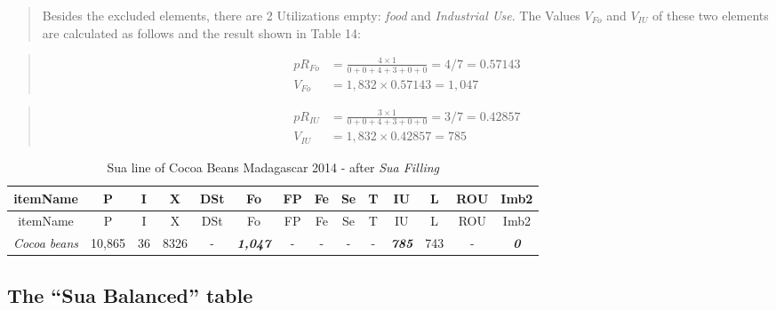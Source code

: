 \documentclass[]{article}
\begin{document}
\begin{quote}
Besides the excluded elements, there are 2 Utilizations empty:
\emph{food} and \emph{Industrial Use}. The Values \(V_{Fo}\) and
\(V_{IU}\) of these two elements are calculated as follows and the
result shown in Table 14:
\end{quote}

\begin{quote}
\begin{equation}
\begin{aligned}
pR_{Fo} &= \frac{4\times 1}{0 + 0 + 4 + 3 + 0 + 0} = 4/7 = 0.57143 \\
V_{Fo} &= 1,832 \times 0.57143 = 1,047 
\end{aligned}
\end{equation}
\end{quote}

\begin{quote}
\end{quote}

\begin{quote}
\begin{equation}
\begin{aligned}
\label{eq:VIUC}
pR_{IU} &= \frac{3\times 1}{0 + 0 + 4 + 3 + 0 + 0} = 3/7 = 0.42857\\
V_{IU} &= 1,832 \times 0.42857 = 785
\end{aligned}
\end{equation}
\end{quote}

\begin{longtable}[]{@{}cccccccccccccc@{}}
\caption{Sua line of Cocoa Beans Madagascar 2014 - after \emph{Sua
Filling}}\tabularnewline
\toprule
itemName & P & I & X & DSt & Fo & FP & Fe & Se & T & IU & L & ROU &
Imb2\tabularnewline
\midrule
\endfirsthead
\toprule
itemName & P & I & X & DSt & Fo & FP & Fe & Se & T & IU & L & ROU &
Imb2\tabularnewline
\midrule
\endhead
\emph{Cocoa beans} & 10,865 & 36 & 8326 & - & \textbf{\emph{1,047}} & -
& - & - & - & \textbf{\emph{785}} & 743 & - &
\textbf{\emph{0}}\tabularnewline
\bottomrule
\end{longtable}

\subsection*{\texorpdfstring{The ``Sua Balanced''
table}{The Sua Balanced table}}\label{the-sua-balanced-table}
\end{document}
